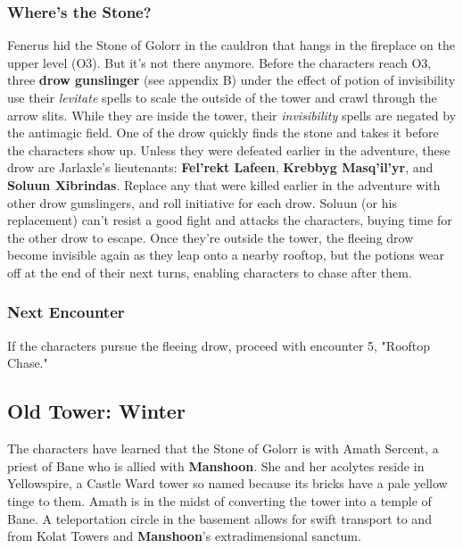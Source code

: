 \documentclass[10pt,a4paper,twoside,twocolumn,openany,nodeprecatedcode]{dndbook}
\begin{document}
\subsubsection{Where's the Stone?}
Fenerus hid the Stone of Golorr in the cauldron that hangs in the fireplace on the upper level (O3). But it's not there anymore.
Before the characters reach O3, three \textbf{drow gunslinger} (see appendix B) under the effect of potion of invisibility use their \textit{levitate} spells to scale the outside of the tower and crawl through the arrow slits. While they are inside the tower, their \textit{invisibility} spells are negated by the antimagic field. One of the drow quickly finds the stone and takes it before the characters show up.
Unless they were defeated earlier in the adventure, these drow are Jarlaxle's lieutenants: \textbf{Fel'rekt Lafeen}, \textbf{Krebbyg Masq'il'yr}, and \textbf{Soluun Xibrindas}. Replace any that were killed earlier in the adventure with other drow gunslingers, and roll initiative for each drow. Soluun (or his replacement) can't resist a good fight and attacks the characters, buying time for the other drow to escape. Once they're outside the tower, the fleeing drow become invisible again as they leap onto a nearby rooftop, but the potions wear off at the end of their next turns, enabling characters to chase after them.
\subsubsection{Next Encounter}
If the characters pursue the fleeing drow, proceed with encounter 5, "Rooftop Chase."
\subsection{Old Tower: Winter}
The characters have learned that the Stone of Golorr is with Amath Sercent, a priest of Bane who is allied with \textbf{Manshoon}. She and her acolytes reside in Yellowspire, a Castle Ward tower so named because its bricks have a pale yellow tinge to them. Amath is in the midst of converting the tower into a temple of Bane. A teleportation circle in the basement allows for swift transport to and from Kolat Towers and \textbf{Manshoon}'s extradimensional sanctum.
\end{document}
